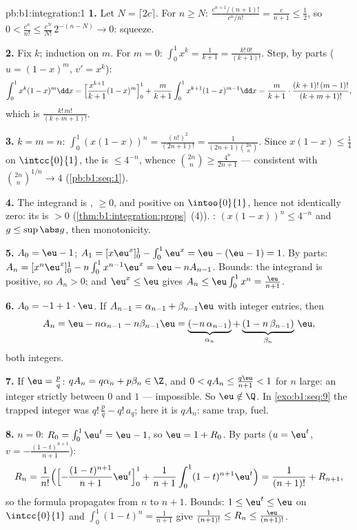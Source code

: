 \begin{solution}{pb:b1:integration:1}
\textbf{1.} Let $N = \lceil 2c \rceil$. For $n \geq N$:
$\frac{c^{n+1}/(n+1)!}{c^n/n!} = \frac{c}{n+1} \leq \frac12$, so
$0 < \frac{c^n}{n!} \leq \frac{c^N}{N!}\,2^{-(n - N)} \to 0$:
squeeze.

\textbf{2.} Fix $k$; induction on $m$. For $m = 0$: $\int_0^1
x^k = \frac{1}{k+1} = \frac{k!\,0!}{(k+1)!}$. Step, by parts
($u = (1-x)^m$, $v' = x^k$):
\[
\int_0^1 x^k (1-x)^m \dd x
= \Bigl[\frac{x^{k+1}}{k+1}(1-x)^m\Bigr]_0^1
+ \frac{m}{k+1}\int_0^1 x^{k+1}(1-x)^{m-1}\dd x
= \frac{m}{k+1}\cdot\frac{(k+1)!\,(m-1)!}{(k+m+1)!} ,
\]
which is $\frac{k!\,m!}{(k+m+1)!}$.

\textbf{3.} $k = m = n$: $\int_0^1 (x(1-x))^n =
\frac{(n!)^2}{(2n+1)!} = \frac{1}{(2n+1)\binom{2n}{n}}$. Since
$x(1-x) \leq \frac14$ on $\intcc{0}{1}$, the  is $\leq
4^{-n}$, whence $\binom{2n}{n} \geq \frac{4^n}{2n+1}$ ---
consistent with $\binom{2n}{n}^{1/n} \to 4$
(\cref{pb:b1:seq:1}).

\textbf{4.} The integrand is , $\geq 0$, and positive
on $\intoo{0}{1}$, hence not identically zero: its  is
$> 0$ (\cref{thm:b1:integration:props}~(4)). :
$(x(1-x))^n \leq 4^{-n}$ and $g \leq \sup\abs g$, then
monotonicity.

\textbf{5.} $A_0 = \eu - 1$; $A_1 = [x\eu^x]_0^1 - \int_0^1
\eu^x = \eu - (\eu - 1) = 1$. By parts: $A_n = [x^n \eu^x]_0^1 -
n\int_0^1 x^{n-1}\eu^x = \eu - n A_{n-1}$. Bounds: the integrand
is positive, so $A_n > 0$; and $\eu^x \leq \eu$ gives $A_n \leq
\eu\int_0^1 x^n = \frac{\eu}{n+1}$.

\textbf{6.} $A_0 = -1 + 1\cdot\eu$. If $A_{n-1} = \alpha_{n-1} +
\beta_{n-1}\eu$ with integer entries, then
\[
A_n = \eu - n\alpha_{n-1} - n\beta_{n-1}\eu
= \underbrace{(-n\,\alpha_{n-1})}_{\alpha_n}
+ \underbrace{(1 - n\,\beta_{n-1})}_{\beta_n}\,\eu ,
\]
both integers.

\textbf{7.} If $\eu = \frac pq$: $q A_n = q\alpha_n + p\beta_n
\in \Z$, and $0 < qA_n \leq \frac{q\eu}{n+1} < 1$ for $n$ large:
an integer strictly between $0$ and $1$ --- impossible. So $\eu
\notin \Q$. In \cref{exo:b1:seq:9} the trapped integer was
$q!\,\frac pq - q!\,a_q$; here it is $qA_n$: same trap,
 fuel.

\textbf{8.} $n = 0$: $R_0 = \int_0^1 \eu^t = \eu - 1$, so $\eu =
1 + R_0$. By parts ($u = \eu^t$, $v = -\frac{(1-t)^{n+1}}{n+1}$):
\[
R_n = \frac{1}{n!}\Bigl(\Bigl[-\frac{(1-t)^{n+1}}{n+1}
\eu^t\Bigr]_0^1 + \frac{1}{n+1}\int_0^1 (1-t)^{n+1}\eu^t\Bigr)
= \frac{1}{(n+1)!} + R_{n+1} ,
\]
so the formula propagates from $n$ to $n + 1$. Bounds: $1 \leq
\eu^t \leq \eu$ on $\intcc{0}{1}$ and $\int_0^1 (1-t)^n =
\frac{1}{n+1}$ give $\frac{1}{(n+1)!} \leq R_n \leq
\frac{\eu}{(n+1)!}$.


\end{solution}
